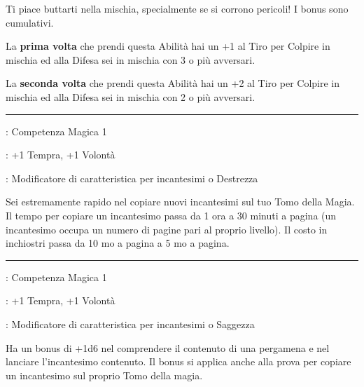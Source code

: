 \begin{multicols}{2}
Ti piace buttarti nella mischia, specialmente se si corrono pericoli! I bonus sono cumulativi.

La \textbf{prima volta} che prendi questa Abilità hai un +1 al Tiro per Colpire in mischia ed alla Difesa sei in mischia con 3 o più avversari.

La \textbf{seconda volta} che prendi questa Abilità hai un +2 al Tiro per Colpire in mischia ed alla Difesa sei in mischia con 2 o più avversari.

\smallskip\noindent\rule{\linewidth}{2pt} \hypertarget{Dattilografo}{}\medskip{}
\noindent
\begin{description}[noitemsep, topsep=0pt, parsep=0pt, partopsep=0pt, leftmargin=0cm, labelwidth=2.5cm]
    \item[\textbf{Requisito}]: Competenza Magica 1
    \item[\textbf{Tiri Salvezza}]: +1 Tempra, +1 Volontà
    \item[\textbf{Caratteristica}]: Modificatore di caratteristica per incantesimi o Destrezza
\end{description}

Sei estremamente rapido nel copiare nuovi incantesimi sul tuo Tomo della Magia. Il tempo per copiare un incantesimo passa da 1 ora a 30 minuti a pagina (un incantesimo occupa un numero di pagine pari al proprio livello). Il costo in inchiostri passa da 10 mo a pagina a 5 mo a pagina.

\smallskip\noindent\rule{\linewidth}{2pt} \hypertarget{Decifrare scritti magici}{}\medskip{}
\noindent
\begin{description}[noitemsep, topsep=0pt, parsep=0pt, partopsep=0pt, leftmargin=0cm, labelwidth=2.5cm]
    \item[\textbf{Requisito}]: Competenza Magica 1
    \item[\textbf{Tiri Salvezza}]: +1 Tempra, +1 Volontà
    \item[\textbf{Caratteristica}]: Modificatore di caratteristica per incantesimi o Saggezza
\end{description}

Ha un bonus di +1d6 nel comprendere il contenuto di una pergamena e nel lanciare l'incantesimo contenuto. Il bonus si applica anche alla prova per copiare un incantesimo sul proprio Tomo della magia.


\end{multicols}
